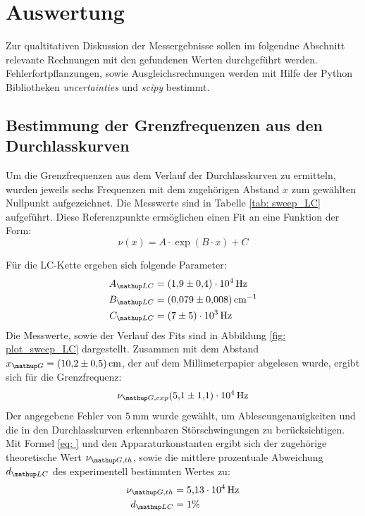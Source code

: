 \section{Auswertung}
Zur qualtitativen Diskussion der Messergebnisse sollen im folgendne Abschnitt relevante Rechnungen mit den gefundenen
Werten durchgeführt werden. Fehlerfortpflanzungen, sowie Ausgleichsrechnungen werden mit
Hilfe der Python Bibliotheken \emph{uncertainties}\cite{uncertainties} und \emph{scipy}\cite{scipy} bestimmt.

\subsection{Bestimmung der Grenzfrequenzen aus den Durchlasskurven}
Um die Grenzfrequenzen aus dem Verlauf der Durchlasskurven zu ermitteln, wurden jeweils sechs
Frequenzen mit dem zugehörigen Abstand $x$ zum gewählten Nullpunkt aufgezeichnet. Die Messwerte
sind in Tabelle \ref{tab: sweep_LC} aufgeführt. Diese Referenzpunkte ermöglichen einen Fit an eine Funktion der Form:
\begin{equation}
  \nu(x) = A \cdot \exp(B\cdot x) + C
  \label{eq: exp_fit}
\end{equation}
\FloatBarrier

Für die LC-Kette ergeben sich folgende Parameter:
\begin{align}
  \begin{aligned}
    A\ua{LC} &= \SI{1.9(4)e4}{\hertz}\\
    B\ua{LC} &= \SI{0.079(8)}{\cm^{-1}}\\
    C\ua{LC} &= \SI{7(5)e3}{\hertz}
  \end{aligned}
  \label{eq: params_LC}
\end{align}
Die Messwerte, sowie der Verlauf des Fits sind in Abbildung \ref{fig: plot_sweep_LC} dargestellt. Zusammen
mit dem Abstand $x\ua{G} = \SI{10.2(5)}{cm}$, der auf dem Millimeterpapier abgelesen wurde, ergibt sich
für die Grenzfrequenz:
\begin{equation}
  \nu\ua{G, exp}\SI{5.1(11)e4}{\hertz}
  \label{eq: nu_g_LC}
\end{equation}
Der angegebene Fehler von $\SI{5}{\milli\meter}$ wurde gewählt, um Ableseungenauigkeiten und die in den Durchlasskurven
erkennbaren Störschwingungen zu berücksichtigen.
Mit Formel \eqref{eq: } und den Apparaturkonstanten ergibt sich der zugehörige theoretische Wert $\nu\ua{G, th}$, sowie die
mittlere prozentuale Abweichung $d\ua{LC}$ des experimentell bestimmten Wertes zu:
\begin{align}
  \nu\ua{G, th} &= \SI{5.13e4}{\hertz} \\
  d\ua{LC} &= 1 \%
\end{align}
